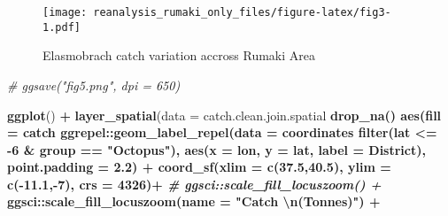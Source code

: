 \documentclass[
]{article}
\newenvironment{Shaded}{\begin{snugshade}}{\end{snugshade}}
\newcommand{\CharTok}[1]{\textcolor[rgb]{0.31,0.60,0.02}{#1}}
\newcommand{\CommentTok}[1]{\textcolor[rgb]{0.56,0.35,0.01}{\textit{#1}}}
\newcommand{\DataTypeTok}[1]{\textcolor[rgb]{0.13,0.29,0.53}{#1}}
\newcommand{\DecValTok}[1]{\textcolor[rgb]{0.00,0.00,0.81}{#1}}
\newcommand{\FloatTok}[1]{\textcolor[rgb]{0.00,0.00,0.81}{#1}}
\newcommand{\KeywordTok}[1]{\textcolor[rgb]{0.13,0.29,0.53}{\textbf{#1}}}
\newcommand{\NormalTok}[1]{#1}
\newcommand{\OperatorTok}[1]{\textcolor[rgb]{0.81,0.36,0.00}{\textbf{#1}}}
\newcommand{\StringTok}[1]{\textcolor[rgb]{0.31,0.60,0.02}{#1}}
\begin{document}
\begin{figure}
\centering
\texttt{[image: reanalysis\_rumaki\_only\_files/figure-latex/fig3-1.pdf]}
\caption{\label{fig:fig3}Elasmobrach catch variation accross Rumaki Area}
\end{figure}

\begin{Shaded}
\begin{Highlighting}[]
 \CommentTok{# ggsave("fig5.png", dpi = 650)}
\end{Highlighting}
\end{Shaded}

\begin{Shaded}
\begin{Highlighting}[]
 \KeywordTok{ggplot}\NormalTok{() }\OperatorTok{+}
\StringTok{  }\KeywordTok{layer_spatial}\NormalTok{(}\DataTypeTok{data =}\NormalTok{ catch.clean.join.spatial }\OperatorTok{%>%}\StringTok{ }
\StringTok{                  }\KeywordTok{drop_na}\NormalTok{() }\OperatorTok{%>%}\StringTok{ }\KeywordTok{filter}\NormalTok{(group }\OperatorTok{==}\StringTok{ "Small pelagic"}\NormalTok{),}
          \KeywordTok{aes}\NormalTok{(}\DataTypeTok{fill =}\NormalTok{ catch }\OperatorTok{%>%}\KeywordTok{as.factor}\NormalTok{()), }\DataTypeTok{col =} \StringTok{"ivory"}\NormalTok{)}\OperatorTok{+}
\StringTok{  }\NormalTok{ggrepel}\OperatorTok{::}\KeywordTok{geom_label_repel}\NormalTok{(}\DataTypeTok{data =}\NormalTok{ coordinates }\OperatorTok{%>%}\StringTok{ }
\StringTok{                              }\KeywordTok{filter}\NormalTok{(lat }\OperatorTok{<=}\StringTok{ }\DecValTok{-6} \OperatorTok{&}\StringTok{ }\NormalTok{group }\OperatorTok{==}\StringTok{ "Octopus"}\NormalTok{), }
                            \KeywordTok{aes}\NormalTok{(}\DataTypeTok{x =}\NormalTok{ lon, }\DataTypeTok{y =}\NormalTok{ lat, }\DataTypeTok{label =}\NormalTok{ District),}
                            \DataTypeTok{point.padding =} \FloatTok{2.2}\NormalTok{) }\OperatorTok{+}
\StringTok{  }\KeywordTok{coord_sf}\NormalTok{(}\DataTypeTok{xlim =} \KeywordTok{c}\NormalTok{(}\FloatTok{37.5}\NormalTok{,}\FloatTok{40.5}\NormalTok{), }\DataTypeTok{ylim =} \KeywordTok{c}\NormalTok{(}\OperatorTok{-}\FloatTok{11.1}\NormalTok{,}\OperatorTok{-}\DecValTok{7}\NormalTok{), }\DataTypeTok{crs =} \DecValTok{4326}\NormalTok{)}\OperatorTok{+}
\StringTok{  }\CommentTok{# ggsci::scale_fill_locuszoom() +}
\StringTok{  }\NormalTok{ggsci}\OperatorTok{::}\KeywordTok{scale_fill_locuszoom}\NormalTok{(}\DataTypeTok{name =} \StringTok{"Catch }\CharTok{\textbackslash{}n}\StringTok{(Tonnes)"}\NormalTok{) }\OperatorTok{+}
}}}}
\end{Highlighting}
\end{Shaded}
\end{document}
